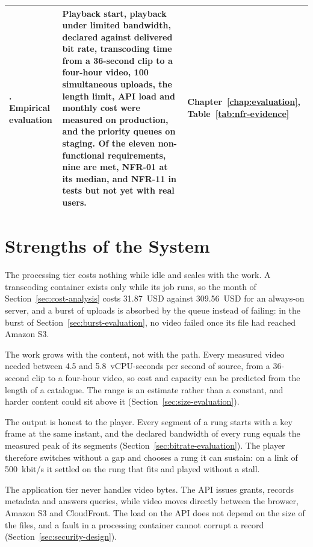 \begin{table}[htbp]
\begin{tabularx}{\textwidth}{>{\raggedright\arraybackslash}p{} >{\raggedright\arraybackslash}X >{\raggedright\arraybackslash}p{}}
5. Empirical evaluation & Playback start, playback under limited bandwidth, declared against delivered bit rate, transcoding time from a 36-second clip to a four-hour video, 100 simultaneous uploads, the length limit, API load and monthly cost were measured on production, and the priority queues on staging. Of the eleven non-functional requirements, nine are met, NFR-01 at its median, and NFR-11 in tests but not yet with real users. & Chapter~\ref{chap:evaluation}, Table~\ref{tab:nfr-evidence} \\
\bottomrule
\end{tabularx}
\end{table}

\section{Strengths of the System}
\label{sec:strengths}

The processing tier costs nothing while idle and scales with the work. A transcoding container
exists only while its job runs, so the month of Section~\ref{sec:cost-analysis} costs 31.87~USD
against 309.56~USD for an always-on server, and a burst of uploads is absorbed by the queue instead of
failing: in the burst of Section~\ref{sec:burst-evaluation}, no video failed once its file had
reached Amazon S3.

The work grows with the content, not with the path. Every measured video needed between 4.5 and
5.8~vCPU-seconds per second of source, from a 36-second clip to a four-hour video, so cost and
capacity can be predicted from the length of a catalogue. The range is an estimate rather than a
constant, and harder content could sit above it (Section~\ref{sec:size-evaluation}).

The output is honest to the player. Every segment of a rung starts with a key frame at the same
instant, and the declared bandwidth of every rung equals the measured peak of its segments
(Section~\ref{sec:bitrate-evaluation}). The player therefore switches without a gap and chooses a rung
it can sustain: on a link of 500~kbit/s it settled on the rung that fits and played without a stall.

The application tier never handles video bytes. The API issues grants, records metadata and answers
queries, while video moves directly between the browser, Amazon S3 and CloudFront. The load on the API
does not depend on the size of the files, and a fault in a processing container cannot corrupt a
record (Section~\ref{sec:security-design}).

